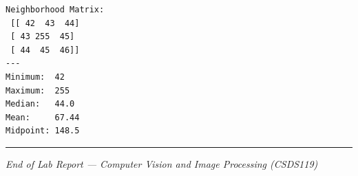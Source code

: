 \documentclass[12pt]{article}
\begin{document}
\begin{lstlisting}[style=output]
Neighborhood Matrix:
 [[ 42  43  44]
 [ 43 255  45]
 [ 44  45  46]]
---
Minimum:  42
Maximum:  255
Median:   44.0
Mean:     67.44
Midpoint: 148.5
\end{lstlisting}

\vfill
\hrule
\begin{center}
    \small \textit{End of Lab Report — Computer Vision and Image Processing (CSDS119)}
\end{center}
\end{document}
